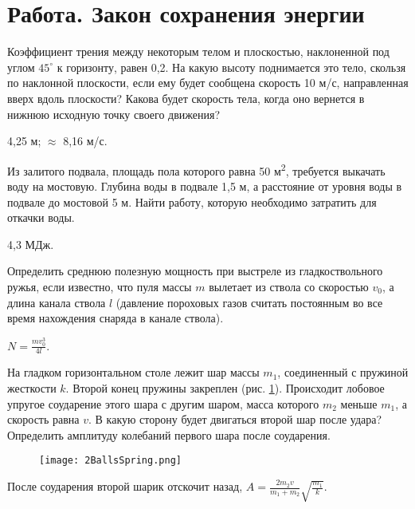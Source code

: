\section{Работа. Закон сохранения энергии}

\begin{ex} %
Коэффициент трения между некоторым телом и плоскостью, наклоненной под углом $45^{\circ}$ к горизонту, равен 0,2. На какую высоту поднимается это тело, скользя по наклонной плоскости, если ему будет сообщена скорость 10 м/с, направленная вверх вдоль плоскости? Какова будет скорость тела, когда оно вернется в нижнюю исходную точку своего движения?
\begin{ans}
4,25 м; $\approx$ 8,16 м/с.
\end{ans}
\end{ex}

\begin{ex} %
Из залитого подвала, площадь пола которого равна 50 м\textsuperscript{2}, требуется выкачать воду на мостовую. Глубина воды в подвале 1,5 м, а расстояние от уровня воды в подвале до мостовой 5 м. Найти работу, которую необходимо затратить для откачки воды.
\begin{ans}
4,3 МДж.
\end{ans}
\end{ex}

\begin{ex} %
Определить среднюю полезную мощность при выстреле из гладкоствольного ружья, если известно, что пуля массы $m$ вылетает из ствола со скоростью $v_0$, а длина канала ствола $l$ (давление пороховых газов считать постоянным во все время нахождения снаряда в канале ствола).
\begin{ans}
$N =\frac{mv_{0}^3}{4l}$.
\end{ans}
\end{ex}


\begin{ex} %
На гладком горизонтальном столе лежит шар массы $m_1$, соединенный с пружиной жесткости $k$. Второй конец пружины закреплен (рис. \ref{2BallsSpring}). Происходит лобовое упругое соударение этого шара с другим шаром, масса которого $m_2$ меньше $m_1$, а скорость равна $v$. В какую сторону будет двигаться второй шар после удара? Определить амплитуду колебаний первого шара после соударения.

\begin{figure}[h]
\centering
\texttt{[image: 2BallsSpring.png]}
\caption{}
\label{2BallsSpring}
\end{figure}

\begin{ans}
После соударения второй шарик отскочит назад, $A = \frac{2m_2v}{m_1+m_2}\sqrt{\frac{m_1}{k}}$.
\end{ans}
\end{ex}

